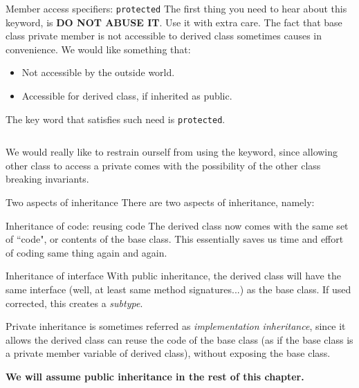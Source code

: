 \begin{frame}[fragile]{Member access specifiers: \texttt{protected}}
The first thing you need to hear about this keyword, is \textbf{DO NOT ABUSE IT}. Use it with extra care. The fact that base class private member is not accessible to derived class sometimes causes in convenience. We would like something that:

\begin{itemize}
	\item Not accessible by the outside world. 
	\item Accessible for derived class, if inherited as public. 
\end{itemize}

The key word that satisfies such need is \texttt{protected}.
\inputminted[fontsize=\small]{c++}{code/rc10access/protected.h}

We would really like to restrain ourself from using the keyword, since allowing other class to access a private comes with the possibility of the other class breaking invariants.
\end{frame}

\begin{frame}{Two aspects of inheritance}
There are two aspects of inheritance, namely:

\begin{block}{Inheritance of code: reusing code}
The derived class now comes with the same set of ``code", or contents of the base class. This essentially saves us time and effort of coding same thing again and again. 
\end{block}

\begin{block}{Inheritance of interface}
With public inheritance, the derived class will have the same interface (well, at least same method signatures...) as the base class. If used corrected, this creates a \textit{subtype}. 
\end{block}

Private inheritance is sometimes referred as \textit{implementation inheritance}, since it allows the derived class can reuse the code of the base class (as if the base class is a private member variable of derived class), without exposing the base class.

\textbf{We will assume public inheritance in the rest of this chapter. }
\end{frame}

